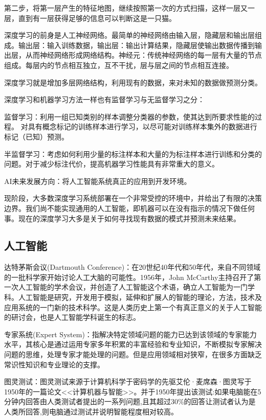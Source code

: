\documentclass[openbib]{article}
\begin{document}
	第二步，将第一层产生的特征地图，继续按照第一次的方式扫描，这样一层又一层，直到有一层获得足够的信息可以判断这是一只猫。
	
	深度学习的前身是人工神经网络。最简单的神经网络由输入层，隐藏层和输出层组成。输出层：输入训练数据，输出层：输出计算结果，隐藏层使输出数据传播到输出层，从而神经网络形成网络结构。神经元：传统神经网络的每一层有大量的节点组成。每层内的节点相互独立，互不干扰，层与层之间的节点相互连接。
	
	深度学习就是增加多层网络结构，利用现有的数据，来对未知的数据做预测分类。
	
	深度学习和机器学习方法一样也有监督学习与无监督学习之分：
	
	监督学习：利用一组已知类别的样本调整分类器的参数，使其达到所要求性能的过程。
	对具有概念标记的训练样本进行学习，以尽可能对训练样本集外的数据进行标记（已知）预测。
	
	半监督学习：考虑如何利用少量的标注样本和大量的为标注样本进行训练和分类的问题。对于减少标注代价，提高机器学习性能具有非常重大的意义。
	
	AI未来发展方向：将人工智能系统真正的应用到开发环境。
	
	现阶段，大多数深度学习系统部署在一个非常受控的环境中，并给出了有限的决策边界。我们尚不能实现通用的人工智能，即机器可以在没有指示的情况下做任何事。现在的深度学习大多是关于如何寻找现有数据的模式并预测未来结果。
	
	\subsection{人工智能}
	
	达特茅斯会议(Dartmouth Conference)：在20世纪40年代和50年代，来自不同领域的一批科学家开始讨论人工大脑的可能性。1956年，John McCarthy主持召开了第一次人工智能的学术会议，并创造了人工智能这个术语，确立人工智能为一门学科。人工智能是研究，开发用于模拟，延伸和扩展人的智能的理论，方法，技术及应用系统的一门新的技术科学。这是人类历史上第一个有真正意义的关于人工智能的研讨会，也是人工智能学科诞生的标志。
	
	专家系统(Expert System)：指解决特定领域问题的能力已达到该领域的专家能力水平，其核心是通过运用专家多年积累的丰富经验和专业知识，不断模拟专家解决问题的思维，处理专家才能处理的问题。但是应用领域相对狭窄，在很多方面缺乏常识性知识和专业理论的支撑。
	
	图灵测试：图灵测试来源于计算机科学于密码学的先驱艾伦·麦席森·图灵写于1950年的一篇论文<<计算机器与智能>>。并于1950年提出该测试:如果电脑能在5分钟内回答由人类测试者提出的一系列问题,且其超过30\%的回答让测试者认为是人类所回答,则电脑通过测试并说明智能程度相对较高。
	
\end{document}
